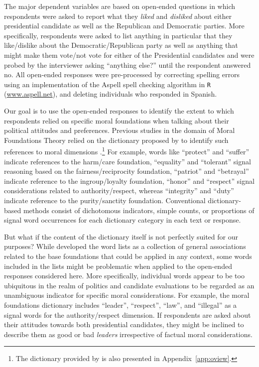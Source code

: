 \documentclass[12pt]{article}
\begin{document}
The major dependent variables are based on open-ended questions in which respondents were asked to report what they \textit{liked} and \textit{disliked} about either presidential candidate as well as the Republican and Democratic parties. More specifically, respondents were asked to list anything in particular that they like/dislike about the Democratic/Republican party as well as anything that might make them vote/not vote for either of the Presidential candidates and were probed by the interviewer asking ``anything else?'' until the respondent answered no. All open-ended responses were pre-processed by correcting spelling errors using an implementation of the Aspell spell checking algorithm in \texttt{R} (\url{www.aspell.net}), and deleting individuals who responded in Spanish. 

Our goal is to use the open-ended responses to identify the extent to which respondents relied on specific moral foundations when talking about their political attitudes and preferences. Previous studies in the domain of Moral Foundations Theory relied on the dictionary proposed by \citet{graham2009liberals} to identify such references to moral dimensions \citep[e.g.][]{clifford2013words}.\footnote{The dictionary provided by \citet{graham2009liberals} is also presented in Appendix~\ref{app:oview}.} For example, words like ``protect'' and ``suffer'' indicate references to the harm/care foundation, ``equality'' and ``tolerant'' signal reasoning based on the fairness/reciprocity foundation, ``patriot'' and ``betrayal'' indicate reference to the ingroup/loyalty foundation, ``honor'' and ``respect'' signal considerations related to authority/respect, whereas ``integrity'' and ``duty'' indicate reference to the purity/sanctity foundation. Conventional dictionary-based methods consist of dichotomous indicators, simple counts, or proportions of signal word occurrences for each dictionary category in each text or response.

But what if the content of the dictionary itself is not perfectly suited for our purposes? While \citet{graham2009liberals} developed the word lists as a collection of general associations related to the base foundations that could be applied in any context, some words included in the lists might be problematic when applied to the open-ended responses considered here. More specifically, individual words appear to be too ubiquitous in the realm of politics and candidate evaluations to be regarded as an unambiguous indicator for specific moral considerations. For example, the moral foundations dictionary includes ``leader'', ``respect'', ``law'', and ``illegal'' as a signal words for the authority/respect dimension. If respondents are asked about their attitudes towards both presidential candidates, they might be inclined to describe them as good or bad \textit{leaders} irrespective of factual moral considerations.
\end{document}
